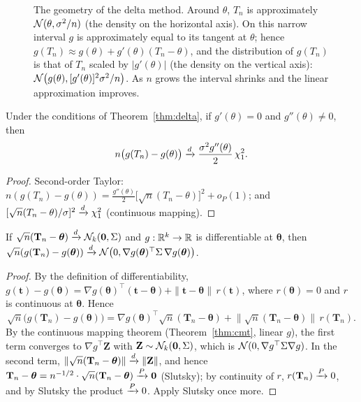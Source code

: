 \documentclass[main.tex]{subfiles}
\begin{document}
\begin{figure}[ht]
\caption{The geometry of the delta method. Around $\theta$, $T_n$ is approximately $\mathcal{N}(\theta,\sigma^2/n)$ (the density on the horizontal axis). On this narrow interval $g$ is approximately equal to its tangent at $\theta$; hence $g(T_n)\approx g(\theta)+g'(\theta)(T_n-\theta)$, and the distribution of $g(T_n)$ is that of $T_n$ scaled by $|g'(\theta)|$ (the density on the vertical axis): $\mathcal{N}\big(g(\theta),[g'(\theta)]^2\sigma^2/n\big)$. As $n$ grows the interval shrinks and the linear approximation improves.}\label{fig:delta}
\end{figure}

\begin{theorem}\label{thm:delta2}
Under the conditions of Theorem~\ref{thm:delta}, if $g'(\theta)=0$ and $g''(\theta)\neq0$, then
\[
n\big(g(T_n)-g(\theta)\big)\xrightarrow{d}\frac{\sigma^2g''(\theta)}{2}\,\chi^2_1 .
\]
\end{theorem}
\begin{proof}
Second-order Taylor: $n(g(T_n)-g(\theta))=\frac{g''(\theta)}{2}\big[\sqrt n(T_n-\theta)\big]^2+o_P(1)$; and $[\sqrt n(T_n-\theta)/\sigma]^2\xrightarrow{d}\chi^2_1$ (continuous mapping).
\end{proof}

\begin{theorem}\label{thm:delta-cok}
If $\sqrt n(\mathbf T_n-\bm\theta)\xrightarrow{d}\mathcal{N}_k(\mathbf 0,\Sigma)$ and $g:\mathbb{R}^k\to\mathbb{R}$ is differentiable at $\bm\theta$, then
$\sqrt n(g(\mathbf T_n)-g(\bm\theta))\xrightarrow{d}\mathcal{N}\big(0,\nabla g(\bm\theta)^\top\Sigma\,\nabla g(\bm\theta)\big)$.
\end{theorem}
\begin{proof}
By the definition of differentiability, $g(\mathbf t)-g(\bm\theta)=\nabla g(\bm\theta)^\top(\mathbf t-\bm\theta)+\|\mathbf t-\bm\theta\|\,r(\mathbf t)$, where $r(\bm\theta)=0$ and $r$ is continuous at $\bm\theta$. Hence
\[
\sqrt n\big(g(\mathbf T_n)-g(\bm\theta)\big)=\nabla g(\bm\theta)^\top\sqrt n(\mathbf T_n-\bm\theta)+\big\|\sqrt n(\mathbf T_n-\bm\theta)\big\|\,r(\mathbf T_n).
\]
By the continuous mapping theorem (Theorem~\ref{thm:cmt}, linear $g$), the first term converges to $\nabla g^\top\mathbf Z$ with $\mathbf Z\sim\mathcal{N}_k(\mathbf 0,\Sigma)$, which is $\mathcal{N}(0,\nabla g^\top\Sigma\nabla g)$. In the second term, $\|\sqrt n(\mathbf T_n-\bm\theta)\|\xrightarrow{d}\|\mathbf Z\|$, and hence $\mathbf T_n-\bm\theta=n^{-1/2}\cdot\sqrt n(\mathbf T_n-\bm\theta)\xrightarrow{P}\mathbf 0$ (Slutsky); by continuity of $r$, $r(\mathbf T_n)\xrightarrow{P}0$, and by Slutsky the product $\xrightarrow{P}0$. Apply Slutsky once more.
\end{proof}
\end{document}
